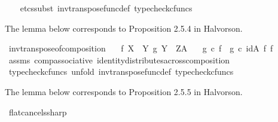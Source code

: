 \begin{isabellebody}
%
\isadelimproof
\ \ %
\endisadelimproof
%
\isatagproof
{}\isamarkupfalse%
\ {\isacharparenleft}{\kern0pt}etcs{\isacharunderscore}{\kern0pt}subst\ inv{\isacharunderscore}{\kern0pt}transpose{\isacharunderscore}{\kern0pt}func{\isacharunderscore}{\kern0pt}def{}{\isacharcomma}{\kern0pt}\ typecheck{\isacharunderscore}{\kern0pt}cfuncs{\isacharparenright}{\kern0pt}%
\endisatagproof
{\isafoldproof}%
%
\isadelimproof
%
\endisadelimproof
%
\begin{isamarkuptext}%
The lemma below corresponds to Proposition 2.5.4 in Halvorson.%
\end{isamarkuptext}\isamarkuptrue%
\isamarkupfalse%
\ inv{\isacharunderscore}{\kern0pt}transpose{\isacharunderscore}{\kern0pt}of{\isacharunderscore}{\kern0pt}composition{\isacharcolon}{\kern0pt}\isanewline
\ \ \ {\isachardoublequoteopen}f{\isacharcolon}{\kern0pt}\ X\ {\isasymrightarrow}\ Y{\isachardoublequoteclose}\ {\isachardoublequoteopen}g{\isacharcolon}{\kern0pt}\ Y\ {\isasymrightarrow}\ Z\isactrlbsup A\isactrlesup {\isachardoublequoteclose}\isanewline
\ \ \ {\isachardoublequoteopen}{\isacharparenleft}{\kern0pt}g\ {\isasymcirc}\isactrlsub c\ f{\isacharparenright}{\kern0pt}\isactrlsup {\isasymflat}\ {\isacharequal}{\kern0pt}\ g\isactrlsup {\isasymflat}\ {\isasymcirc}\isactrlsub c\ {\isacharparenleft}{\kern0pt}id{\isacharparenleft}{\kern0pt}A{\isacharparenright}{\kern0pt}\ {\isasymtimes}\isactrlsub f\ f{\isacharparenright}{\kern0pt}{\isachardoublequoteclose}\isanewline
%
\isadelimproof
\ \ %
\endisadelimproof
%
\isatagproof
{}\isamarkupfalse%
\ assms\ comp{\isacharunderscore}{\kern0pt}associative{}\ identity{\isacharunderscore}{\kern0pt}distributes{\isacharunderscore}{\kern0pt}across{\isacharunderscore}{\kern0pt}composition\isanewline
\ \ \isamarkupfalse%
\ {\isacharparenleft}{\kern0pt}typecheck{\isacharunderscore}{\kern0pt}cfuncs{\isacharcomma}{\kern0pt}\ unfold\ inv{\isacharunderscore}{\kern0pt}transpose{\isacharunderscore}{\kern0pt}func{\isacharunderscore}{\kern0pt}def{}{\isacharcomma}{\kern0pt}\ typecheck{\isacharunderscore}{\kern0pt}cfuncs{\isacharparenright}{\kern0pt}%
\endisatagproof
{\isafoldproof}%
%
\isadelimproof
%
\endisadelimproof
%
\begin{isamarkuptext}%
The lemma below corresponds to Proposition 2.5.5 in Halvorson.%
\end{isamarkuptext}\isamarkuptrue%
\isamarkupfalse%
\ flat{\isacharunderscore}{\kern0pt}cancels{\isacharunderscore}{\kern0pt}sharp{\isacharcolon}{\kern0pt}\isanewline

\end{isabellebody}
